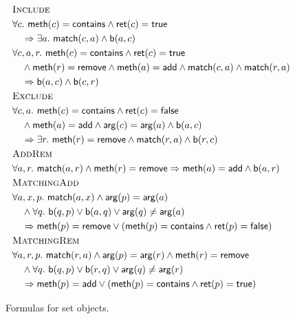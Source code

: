 \begin{figure}

  \footnotesize
  \begin{align*}
    & \textsc{Include} \\
    & \forall c.\ {\sf meth}(c) = {\sf contains} \land {\sf ret}(c) = {\sf true} \\
    & \quad \implies \exists a.\ {\sf match}(c,a) \land {\sf b}(a,c) \\
    & \forall c,a,r.\ {\sf meth}(c)={\sf contains} \land {\sf ret}(c) = {\sf true} \\
    & \quad \land {\sf meth}(r) = {\sf remove}\land {\sf meth}(a) = {\sf add} \land  {\sf match}(c,a) \land {\sf match}(r,a)  \\ %
    & \quad \implies {\sf b}(a,c) \land {\sf b}(c,r)
    \\
    & \textsc{Exclude} \\
    & \forall c,a.\ {\sf meth}(c)={\sf contains} \land {\sf ret}(c) = {\sf false} \\
    & \quad \land {\sf meth}(a) = {\sf add}\land {\sf arg}(c) = {\sf arg}(a) \land {\sf b}(a,c) \\
    & \quad \implies \exists r.\ {\sf meth}(r)={\sf remove} \land {\sf match}(r,a) \land {\sf b}(r,c)
    \\
    & \textsc{AddRem} \\
    & \forall a,r.\ {\sf match}(a,r) \land {\sf meth}(r) = {\sf remove}  \implies {\sf meth}(a)={\sf add} \land {\sf b}(a,r) 
    \\
    & \textsc{MatchingAdd} \\
    & \forall a,x,p.\ {\sf match}(a,x) \land {\sf arg}(p) = {\sf arg}(a) \\
    & \quad \land \forall q.\ {\sf b}(q,p) \vee {\sf b}(a,q) \vee {\sf arg}(q)\neq {\sf arg}(a) \\
    & \quad \implies {\sf meth}(p)={\sf remove} \vee ({\sf meth}(p)={\sf contains} \land {\sf ret}(p) = {\sf false}) 
    \\
    & \textsc{MatchingRem} \\
    & \forall a,r,p.\ {\sf match}(r,a) \land {\sf arg}(p) = {\sf arg}(r) \land {\sf meth}(r)={\sf remove}\\
    & \quad \land \forall q.\ {\sf b}(q,p) \vee {\sf b}(r,q) \vee {\sf arg}(q)\neq {\sf arg}(r) \\
    & \quad \implies {\sf meth}(p)={\sf add} \vee ({\sf meth}(p)={\sf contains} \land {\sf ret}(p) = {\sf true}) 
  \end{align*}

  \caption{Formulas for set objects.}
  \label{fig:formulas:set}

\end{figure}

